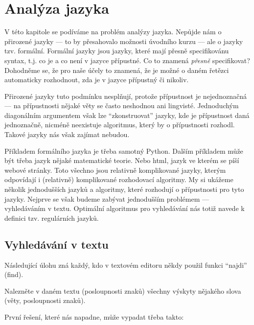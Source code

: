 \ifx\ucebnice\undefined

\setcounter{section}{3}
\fi
\section{Analýza jazyka}
V této kapitole se podíváme na problém analýzy jazyka.  Nepůjde nám o přirozené jazyky ---
to by přesahovalo možnosti úvodního kurzu --- ale o jazyky tzv. formální. Formální jazyky
jsou jazyky, které mají přesně specifikovánu syntax, t.j. co je a co není v jazyce přípustné.
Co to znamená \emph{přesně} specifikovat? Dohodněme se, že pro naše účely to znamená,
že je možné o daném řetězci automaticky rozhodnout, zda je v jazyce přípustný či nikoliv.

\begin{doplneni}
Přirozené jazyky tuto podmínku nesplňují, protože přípustnost je nejednoznačná ---
na přípustnosti nějaké věty se často neshodnou ani lingvisté. Jednoduchým diagonálním
argumentem však lze ``zkonstruovat'' jazyky, kde je přípustnost daná jednoznačně, nicméně
neexistuje algoritmus, který by o přípustnosti rozhodl.  Takové jazyky nás však zajímat nebudou.
\end{doplneni}

Příkladem formálního jazyka je třeba samotný Python. Dalším příkladem může být třeba
jazyk nějaké matematické teorie.  Nebo html, jazyk ve kterém se píší webové stránky. Toto
všechno jsou relativně komplikované jazyky, kterým odpovídají i (relativně) komplikované
rozhodovací algoritmy.  My si ukážeme několik jednodušších jazyků a algoritmy, které rozhodují o
přípustnosti pro tyto jazyky. Nejprve se však budeme zabývat jednodušším problémem ---
vyhledáváním v textu.  Optimální algoritmus pro vyhledávání nás totiž navede k definici
tzv. regulárních jazyků.

\subsection*{Vyhledávání v textu}

Následující úlohu zná každý, kdo v textovém editoru někdy použil funkci ``najdi'' (find).

\begin{uloha}\label{uloha:substring}
Nalezněte v daném textu (posloupnosti znaků) všechny výskyty nějakého slova
(věty, posloupnosti znaků).
\end{uloha}

První řešení, které nás napadne, může vypadat třeba takto:


